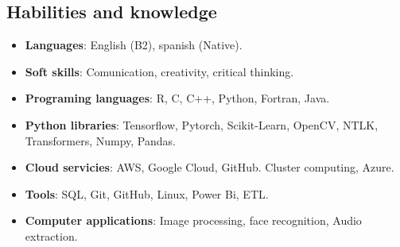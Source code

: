 \documentclass[a3paper]{adcv_color}
\begin{document}
\begin{minipage}{0.65\linewidth}
	\begin{addmargin}[0.5em]{0.5em}
		\section{Habilities and knowledge}

		\begin{itemize}
			\setlength\itemsep{0em}
			\item \textbf{Languages}: English (B2), spanish (Native).
			\item \textbf{Soft skills}:
				Comunication, creativity, critical thinking.
			\item \textbf{Programing languages}:
				R, C, C++, Python, Fortran, Java.
			\item \textbf{Python libraries}:
				Tensorflow, Pytorch, Scikit-Learn, OpenCV, NTLK, Transformers, Numpy, Pandas.
			\item \textbf{Cloud servicies}:
				AWS, Google Cloud, GitHub. Cluster computing, Azure.
			\item \textbf{Tools}:
				SQL, Git, GitHub, Linux, Power Bi, ETL.
			\item \textbf{Computer applications}:
				Image processing, face recognition, Audio extraction.
		\end{itemize}
	\end{addmargin}
\end{minipage}
\end{document}
